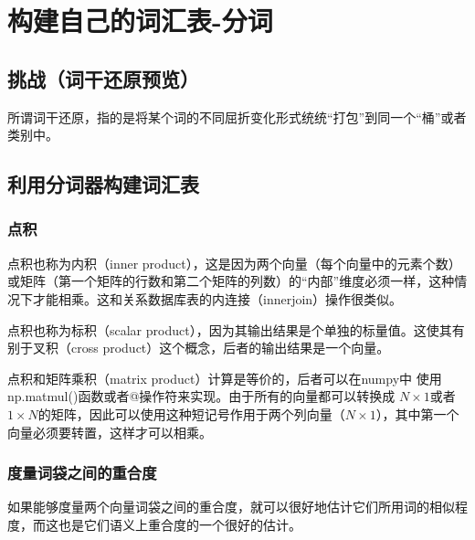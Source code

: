 \chapter{构建自己的词汇表-分词\label{Ch02}}
\section{挑战（词干还原预览）}
所谓词干还原，指的是将某个词的不同屈折变化形式统统“打包”到同一个“桶”或者类别中。
\section{利用分词器构建词汇表}

\subsection{点积}
点积也称为内积（inner product），这是因为两个向量（每个向量中的元素个数）或矩阵（第一个矩阵的行数和第二个矩阵的列数）的“内部”维度必须一样，这种情况下才能相乘。这和关系数据库表的内连接（innerjoin）操作很类似。

点积也称为标积（scalar product），因为其输出结果是个单独的标量值。这使其有别于叉积（cross product）这个概念，后者的输出结果是一个向量。

\begin{tcolorbox}
    点积和矩阵乘积（matrix product）计算是等价的，后者可以在numpy中
    使用np.matmul()函数或者@操作符来实现。由于所有的向量都可以转换成
    $N \times 1$或者$1 \times N$的矩阵，因此可以使用这种短记号作用于两个列向量（$N\times1$），其中第一个向量必须要转置，这样才可以相乘。
\end{tcolorbox}
\subsection{度量词袋之间的重合度}
如果能够度量两个向量词袋之间的重合度，就可以很好地估计它们所用词的相似程度，而这也是它们语义上重合度的一个很好的估计。
\subsection{}
\subsection{}